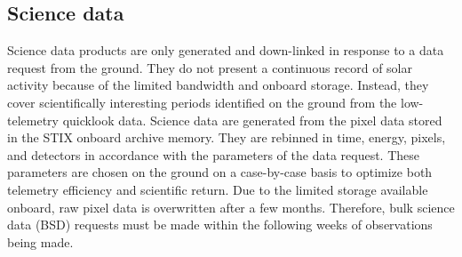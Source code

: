 \documentclass[referee]{preaa} %
\begin{document}
\subsection{Science data }
Science data products are only generated and down-linked in response to a data request from the ground. They do not present a continuous record of solar activity because of the limited bandwidth and onboard storage.  Instead, they cover scientifically interesting periods identified on the ground from the low-telemetry quicklook data. Science data are generated from the pixel data stored in the STIX onboard archive memory.  They are rebinned in time, energy, pixels, and detectors in accordance with the parameters of the data request.  These parameters are chosen on the ground on a case-by-case basis to optimize both telemetry efficiency and scientific return.  Due to the limited storage available onboard, raw pixel data is overwritten after a few months.  Therefore, bulk science data (BSD) requests must be made within the following weeks of observations being made.
\end{document}
